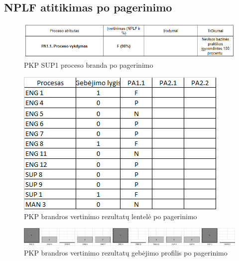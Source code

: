 \documentclass{VUMIFPSkursinis}
\begin{document}
	\subsection{NPLF atitikimas po pagerinimo}

	\begin{figure}[!htbp]
		\includegraphics[scale=0.9]{img/sup1three}
		\caption{PKP SUP1 proceso branda po pagerinimo} %
		\label{img:pkpPries}
	\end{figure}	

	\begin{figure}[!htbp]
		\includegraphics[scale=1]{img/lentelePo}
		\caption{PKP brandros vertinimo rezultatų lentelė po pagerinimo} %
		\label{img:LentelePo}
	\end{figure}

	\begin{figure}[!htbp]
		\includegraphics[scale=0.45]{img/ProfilisPo}
		\caption{PKP brandros vertinimo rezultatų gebėjimo profilis po pagerinimo} %
		\label{img:ProfilisPo}
	\end{figure}
\end{document}
